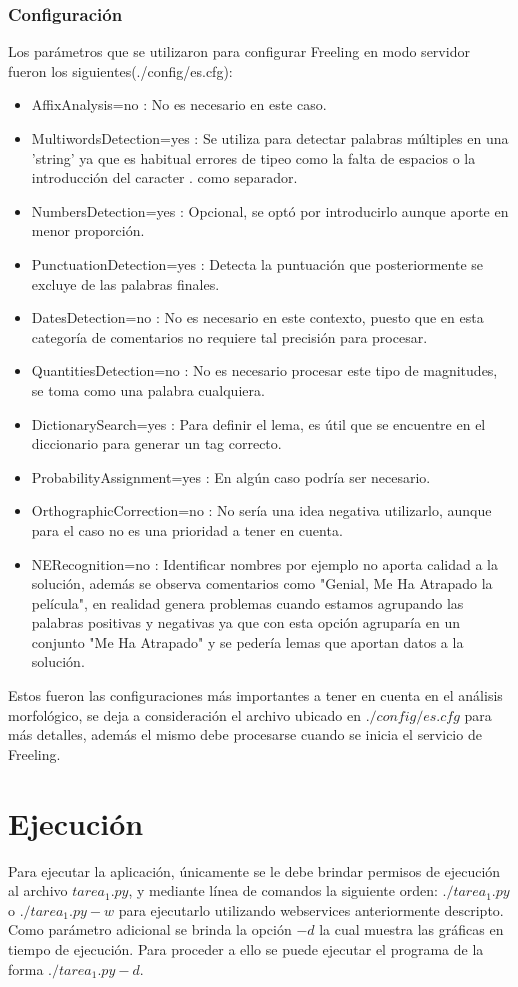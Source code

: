 \documentclass[12pt]{article}
\begin{document}
\subsubsection{Configuración}\label{configFree}
Los parámetros que se utilizaron para configurar Freeling en modo servidor fueron los siguientes(./config/es.cfg):
\begin{itemize}
\item AffixAnalysis=no : No es necesario en este caso.
\item MultiwordsDetection=yes : Se utiliza para detectar palabras múltiples en una 'string' ya que es habitual errores de tipeo como la falta de espacios o la introducción del caracter $.$ como separador.
\item NumbersDetection=yes : Opcional, se optó por introducirlo aunque aporte en menor proporción.
\item PunctuationDetection=yes : Detecta la puntuación que posteriormente se excluye de las palabras finales.
\item DatesDetection=no : No es necesario en este contexto, puesto que en esta categoría de comentarios no requiere tal precisión para procesar.
\item QuantitiesDetection=no : No es necesario procesar este tipo de magnitudes, se toma como una palabra cualquiera. 
\item DictionarySearch=yes : Para definir el lema, es útil que se encuentre en el diccionario para generar un tag correcto.
\item ProbabilityAssignment=yes : En algún caso podría ser necesario.
\item OrthographicCorrection=no : No sería una idea negativa utilizarlo, aunque para el caso no es una prioridad a tener en cuenta.
\item NERecognition=no : Identificar nombres por ejemplo no aporta calidad a la solución, además se observa comentarios como "Genial, Me Ha Atrapado la película", en realidad genera problemas cuando estamos agrupando las palabras positivas y negativas ya que con esta opción agruparía en un conjunto "Me Ha Atrapado" y se pedería lemas que aportan datos a la solución.
\end{itemize}
Estos fueron las configuraciones más importantes a tener en cuenta en el análisis morfológico, se deja a consideración el archivo ubicado en $./config/es.cfg$ para más detalles, además el mismo debe procesarse cuando se inicia el servicio de Freeling.


\section{Ejecución}
Para ejecutar la aplicación, únicamente se le debe brindar permisos de ejecución al archivo $tarea_1.py$, y mediante línea de comandos la siguiente orden:
$./tarea_1.py$
o $./tarea_1.py -w$ para ejecutarlo utilizando webservices anteriormente descripto.
Como parámetro adicional se brinda la opción $-d$ la cual muestra las gráficas en tiempo de ejecución. Para proceder a ello se puede ejecutar el programa de la forma $./tarea_1.py -d$.
\end{document}
